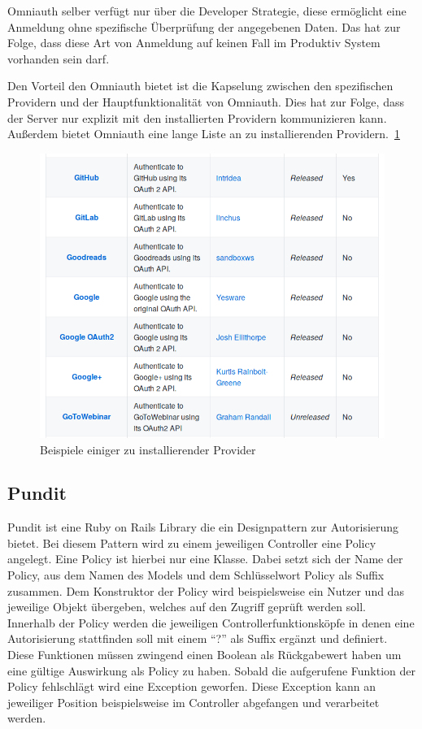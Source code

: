 \documentclass[paper=a4,fontsize=12pt,parskip=half]{scrartcl}
\begin{document}

	Omniauth selber verfügt nur über die Developer Strategie, diese ermöglicht eine Anmeldung ohne spezifische Überprüfung der angegebenen Daten. Das hat zur Folge, dass diese Art von Anmeldung auf keinen Fall im Produktiv System vorhanden sein darf.

	Den Vorteil den Omniauth bietet ist die Kapselung zwischen den spezifischen Providern und der Hauptfunktionalität von Omniauth. Dies hat zur Folge, dass der Server nur explizit mit den installierten Providern kommunizieren kann. Außerdem bietet Omniauth eine lange Liste an zu installierenden Providern.~\ref{fig:provider-list}

	\begin{figure}[h]
                \includegraphics[width=\textwidth]{images/provider-list.png}
		\caption{Beispiele einiger zu installierender Provider }
		\label{fig:provider-list}
	\end{figure}

	\subsection{Pundit}
	\label{sec: pundit}
	Pundit ist eine Ruby on Rails Library die ein Designpattern zur Autorisierung bietet. Bei diesem Pattern wird zu einem jeweiligen Controller eine Policy angelegt. Eine Policy ist hierbei nur eine Klasse. Dabei setzt sich der Name der Policy, aus dem Namen des Models und dem Schlüsselwort Policy als Suffix zusammen. Dem Konstruktor der Policy wird beispielsweise ein Nutzer und das jeweilige Objekt übergeben, welches auf den Zugriff geprüft werden soll. Innerhalb der Policy werden die jeweiligen Controllerfunktionsköpfe in denen eine Autorisierung stattfinden soll mit einem \enquote{?} als Suffix ergänzt und definiert. Diese Funktionen müssen zwingend einen Boolean als Rückgabewert haben um eine gültige Auswirkung als Policy zu haben. Sobald die aufgerufene Funktion der Policy fehlschlägt wird eine Exception geworfen. Diese Exception kann an jeweiliger Position beispielsweise im Controller abgefangen und verarbeitet werden.
\end{document}
